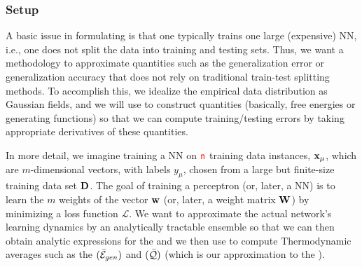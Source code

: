 \subsubsection{Setup}
\label{sxn:mathP_setup}

A basic issue in formulating \SETOL is that one typically trains one large (expensive) NN, i.e., one does not split the data into training and testing sets.
Thus, we want a methodology to approximate quantities such as the generalization error or generalization accuracy that does not rely on traditional train-test splitting methods.
To accomplish this, we idealize the empirical data distribution as Gaussian fields, and we will use \STATMECH to construct quantities (basically, free energies or generating functions) so that we can compute training/testing errors by taking appropriate derivatives of these quantities.

In more detail, we imagine training a NN on ${\color{red}\sf{n}}$ training data instances, ${\mathbf{x}}_{\mu}$, which are $m$-dimensional vectors,
with labels $y_{\mu}$, chosen from a large but finite-size training data set $\mathbf{D}$.
The goal of training a perceptron (or, later, a NN) is to learn the $m$ weights of the vector ${\mathbf{w}}$ (or, later, a weight matrix ${\mathbf{W}}$) by minimizing a loss function $\mathcal{L}$. 
We want to approximate the actual network’s learning dynamics by an analytically tractable ensemble
so that we can then obtain 
analytic expressions for the \emph{\FreeEnergy} and \emph{\GeneratingFunction} we then use to compute
Thermodynamic averages such as the \emph{\AverageGeneralizationError} $(\bar{\mathcal{E}}_{gen})$ and
\emph{\ModelQuality} $(\bar{\mathcal{Q}})$ (which is our approximation to the \emph{\AverageGeneralizationAccuracy}).





